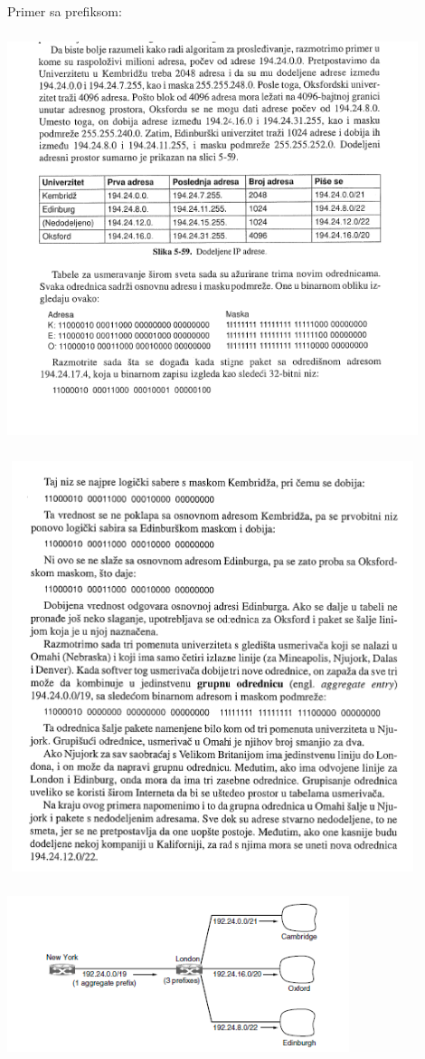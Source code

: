 \documentclass{article} %
\begin{document}
Primer sa prefiksom:
 \begin{center}
\includegraphics[width=12cm, height=12cm]{primerPrefiks1}\\
\end{center}
 \begin{center}
\includegraphics[width=12cm, height=12cm]{primerPrefiks2}\\
\end{center}
 \begin{center}
\includegraphics[width=10cm, height=5cm]{primerPrefiks3}\\
\end{center}
\end{document}
